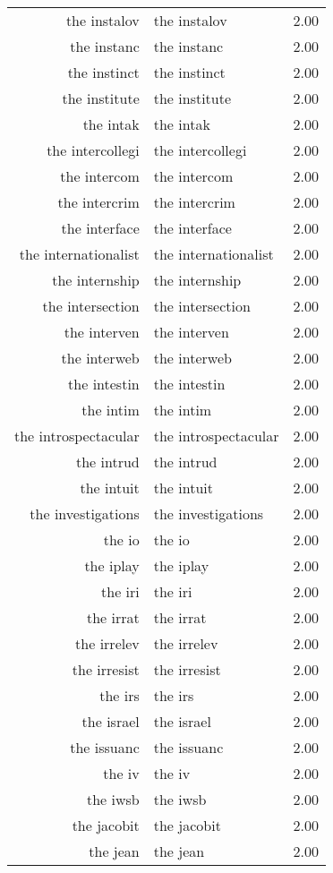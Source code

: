 \begin{table}[ht]
\begin{tabular}{rlr}
  the instalov & the instalov & 2.00 \\ 
  the instanc & the instanc & 2.00 \\ 
  the instinct & the instinct & 2.00 \\ 
  the institute & the institute & 2.00 \\ 
  the intak & the intak & 2.00 \\ 
  the intercollegi & the intercollegi & 2.00 \\ 
  the intercom & the intercom & 2.00 \\ 
  the intercrim & the intercrim & 2.00 \\ 
  the interface & the interface & 2.00 \\ 
  the internationalist & the internationalist & 2.00 \\ 
  the internship & the internship & 2.00 \\ 
  the intersection & the intersection & 2.00 \\ 
  the interven & the interven & 2.00 \\ 
  the interweb & the interweb & 2.00 \\ 
  the intestin & the intestin & 2.00 \\ 
  the intim & the intim & 2.00 \\ 
  the introspectacular & the introspectacular & 2.00 \\ 
  the intrud & the intrud & 2.00 \\ 
  the intuit & the intuit & 2.00 \\ 
  the investigations & the investigations & 2.00 \\ 
  the io & the io & 2.00 \\ 
  the iplay & the iplay & 2.00 \\ 
  the iri & the iri & 2.00 \\ 
  the irrat & the irrat & 2.00 \\ 
  the irrelev & the irrelev & 2.00 \\ 
  the irresist & the irresist & 2.00 \\ 
  the irs & the irs & 2.00 \\ 
  the israel & the israel & 2.00 \\ 
  the issuanc & the issuanc & 2.00 \\ 
  the iv & the iv & 2.00 \\ 
  the iwsb & the iwsb & 2.00 \\ 
  the jacobit & the jacobit & 2.00 \\ 
  the jean & the jean & 2.00 \\ 

\end{tabular}
\end{table}
